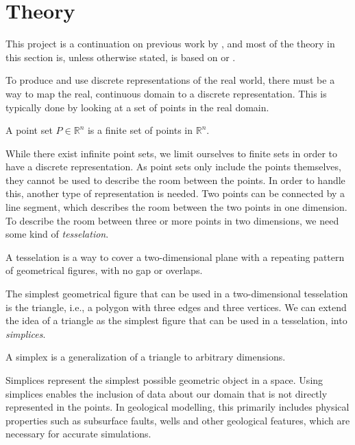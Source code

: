 \section{Theory}
\label{sec:Theory}
This project is a continuation on previous work by \textcite{UPR_thesis}, and most of the theory in this section is, unless otherwise stated, is based on \textcite{UPR_thesis} or \textcite{UPR_chapter}.

To produce and use discrete representations of the real world, there must be a way to map the real, continuous domain to a discrete representation. This is typically done by looking at a set of points in the real domain.
\begin{definition}
A point set $P \in \mathbb{R}^n$ is a finite set of points in $\mathbb{R}^n$.
\end{definition}
While there exist infinite point sets, we limit ourselves to finite sets in order to have a discrete representation. As point sets only include the points themselves, they cannot be used to describe the room between the points. In order to handle this, another type of representation is needed. Two points can be connected by a line segment, which describes the room between the two points in one dimension. To describe the room between three or more points in two dimensions, we need some kind of \emph{tesselation}.

\begin{definition}[Tesselation]
A tesselation is a way to cover a two-dimensional plane with a repeating pattern of geometrical figures, with no gap or overlaps.
\end{definition}
The simplest geometrical figure that can be used in a two-dimensional tesselation is the triangle, i.e., a polygon with three edges and three vertices. We can extend the idea of a triangle as the simplest figure that can be used in a tesselation, into \emph{simplices}.


\begin{definition}[Simplex]
A simplex is a generalization of a triangle to arbitrary dimensions.
\end{definition}
Simplices represent the simplest possible geometric object in a space. Using simplices enables the inclusion of data about our domain that is not directly represented in the points. In geological modelling, this primarily includes physical properties such as subsurface faults, wells and other geological features, which are necessary for accurate simulations.

